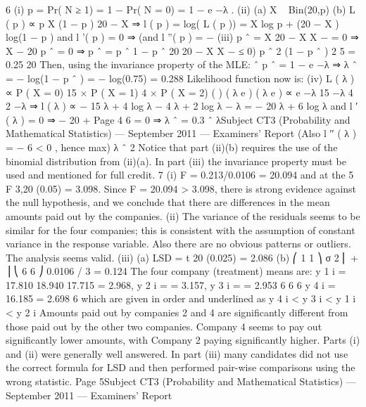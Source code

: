 \documentclass[a4paper,12pt]{article}
\begin{document}
6
(i) p = Pr( N ≥ 1) = 1 − Pr( N = 0) = 1 − e −λ .
(ii) (a)
X ~ Bin(20,p)
(b)
L ( p ) ∝ p X (1 − p ) 20 − X
⇒ l ( p ) = log( L ( p )) = X log p + (20 − X ) log(1 − p )
and l '( p ) = 0 ⇒
(and l ''( p ) = −
(iii)
p ˆ =
X 20 − X
X
−
= 0 ⇒ X − 20 p ˆ = 0 ⇒ p ˆ =
p ˆ
1 − p ˆ
20
20 − X
X
−
≤ 0)
p ˆ 2 (1 − p ˆ ) 2
5
= 0.25
20
Then, using the invariance property of the MLE:
ˆ
p ˆ = 1 − e −λ ⇒ λ ˆ = − log(1 − p ˆ ) = − log(0.75) = 0.288
Likelihood function now is:
(iv)
L ( λ ) ∝ P ( X = 0) 15 × P ( X = 1) 4 × P ( X = 2)
( ) ( λ e ) ( λ e )
∝ e −λ
15
−λ
4
2 −λ
⇒ l ( λ ) ∝ − 15 λ + 4 log λ − 4 λ + 2 log λ − λ = − 20 λ + 6 log λ
and l ′ ( λ ) = 0 ⇒ − 20 +
Page 4
6
= 0 ⇒ λ ˆ = 0.3
ˆ λSubject CT3 (Probability and Mathematical Statistics) — September 2011 — Examiners’ Report
(Also l ′′ ( λ ) = −
6
< 0 , hence max)
λ ˆ 2
Notice that part (ii)(b) requires the use of the binomial distribution from (ii)(a). In part (iii)
the invariance property must be used and mentioned for full credit.
7
(i) F = 0.213/0.0106 = 20.094 and at the 5%
F 3,20 (0.05) = 3.098.
Since F = 20.094 > 3.098, there is strong evidence against the null hypothesis, and we conclude that there are differences in the mean amounts paid out by the companies.
(ii) The variance of the residuals seems to be similar for the four companies; this is consistent with the assumption of constant variance in the response variable.
Also there are no obvious patterns or outliers. The analysis seems valid.
(iii) (a)
LSD = t 20 (0.025)
= 2.086
(b)
⎛ 1 1 ⎞
σ 2 ⎜ + ⎟
⎝ 6 6 ⎠
0.0106 / 3 = 0.124
The four company (treatment) means are:
y 1 i = 17.810
18.940
17.715
= 2.968, y 2 i =
= 3.157, y 3 i =
= 2.953
6
6
6
y 4 i = 16.185
= 2.698
6
which are given in order and underlined as
y 4 i < y 3 i < y 1 i < y 2 i
Amounts paid out by companies 2 and 4 are significantly different from those paid out by the other two companies. Company 4 seems to pay out significantly lower amounts, with Company 2 paying
significantly higher.
Parts (i) and (ii) were generally well answered. In part (iii) many candidates did not use the
correct formula for LSD and then performed pair-wise comparisons using the wrong statistic.
Page 5Subject CT3 (Probability and Mathematical Statistics) — September 2011 — Examiners’ Report
\end{document}

